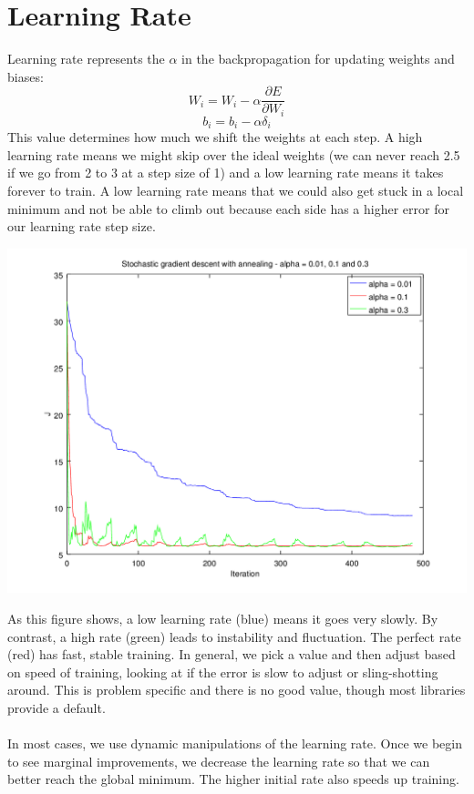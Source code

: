 \documentclass{article}
\begin{document}
\section{Learning Rate}
    Learning rate represents the $\alpha$ in the backpropagation for updating weights and biases:
    $$W_i =  W_i - \alpha \frac{\partial E}{\partial W_i}$$
    $$b_i =  b_i - \alpha \delta_i$$
    This value determines how much we shift the weights at each step. A high learning rate means we might skip over the ideal weights (we can never reach 2.5 if we go from 2 to 3 at a step size of 1) and a low learning rate means it takes forever to train. A low learning rate means that we could also get stuck in a local minimum and not be able to climb out because each side has a higher error for our learning rate step size.
    \begin{center}
        \includegraphics[scale=0.4]{learningrate.png}
    \end{center}
    As this figure shows, a low learning rate (blue) means it goes very slowly. By contrast, a high rate (green) leads to instability and fluctuation. The perfect rate (red) has fast, stable training. In general, we pick a value and then adjust based on speed of training, looking at if the error is slow to adjust or sling-shotting around. This is problem specific and there is no good value, though most libraries provide a default.
    \\
    \\
    In most cases, we use dynamic manipulations of the learning rate. Once we begin to see marginal improvements, we decrease the learning rate so that we can better reach the global minimum. The higher initial rate also speeds up training.
    
\end{document}
